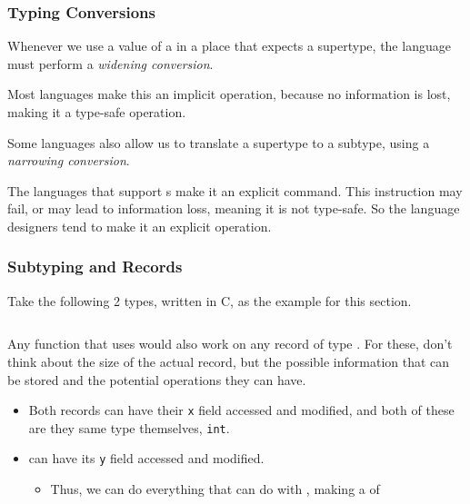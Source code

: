 \subsubsection{Typing Conversions}\label{subsubsec:Typing_Conversions}
\begin{definition}\label{def:Widening_Conversion}
  Whenever we use a value of a  in a place that expects a supertype, the language must perform a \emph{widening conversion}.

  \begin{remark}[Implicit]\label{rmk:Widening_Conversion_Implicit}
    Most languages make this an implicit operation, because no information is lost, making it a type-safe operation.
  \end{remark}
\end{definition}

\begin{definition}\label{def:Narrowing_Conversion}
  Some languages also allow us to translate a supertype to a subtype, using a \emph{narrowing conversion}.

  \begin{remark}[Explicit]\label{rmk:Narrowing_Conversion_Explicit}
    The languages that support s make it an explicit command.
    This instruction may fail, or may lead to information loss, meaning it is not type-safe.
    So the language designers tend to make it an explicit operation.
  \end{remark}
\end{definition}

\subsubsection{Subtyping and Records}\label{subsubsec:Subtyping_and_Records}
Take the following 2 types, written in C, as the example for this section.
\inputminted[frame=lines,linenos]{c}{./EDAP05-Concepts_Programming_Languages-Sections/Advanced_Data_Types/Code/Subtyping_Records.c}

Any function that uses  would also work on any record of type .
For these, don't think about the size of the actual record, but the possible information that can be stored and the potential operations they can have.
\begin{itemize}[noitemsep]
\item Both records can have their \texttt{x} field accessed and modified, and both of these are they same type themselves, \texttt{int}.
\item {} can have its \texttt{y} field accessed and modified.
  \begin{itemize}[noitemsep]
  \item Thus, we can do everything that  can do with , making  a  of 
  \end{itemize}
\end{itemize}

